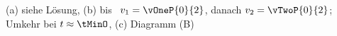 (a) siehe Lösung, (b) bis \tMinO\ $v_1 = \vOneP{0}{2}$, danach $v_2 = \vTwoP{0}{2}$; Umkehr bei $t\approx\tMinO$, (c) Diagramm (B)
